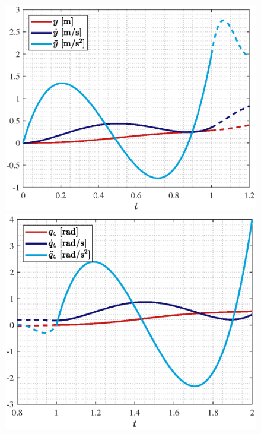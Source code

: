 \documentclass[../DC2019003Bouma.tex]{subfiles}
\begin{document}
\begin{figure}[bt!]
\begin{minipage}[c]{.5\textwidth}
\centering
\includegraphics[width=\textwidth]{ytraj01.eps}
\end{minipage}
\begin{minipage}[c]{.5\textwidth}
\centering
\includegraphics[width=\textwidth]{q4traj12.eps}
\end{minipage}


\end{figure}
\end{document}
